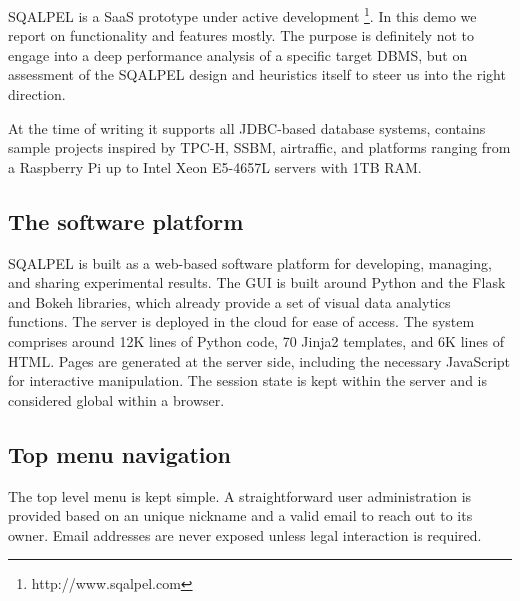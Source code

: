 \documentclass{cidr-2019}
\begin{document}
 
{\sc SQALPEL} is a SaaS prototype under active development \footnote{http://www.sqalpel.com }.
In this
demo we report on functionality and features mostly. The purpose is definitely
not to engage into a deep performance analysis of a specific target
DBMS, but on assessment of the {\sc SQALPEL} design and heuristics itself to
steer us into the right direction. 

At the time of writing it supports all JDBC-based database systems, contains sample projects inspired by TPC-H, SSBM, airtraffic, and platforms ranging from a Raspberry Pi up to Intel Xeon E5-4657L servers with 1TB RAM.


\subsection{The software platform}\label{GUI}
{\sc SQALPEL} is built as a web-based software platform for developing,
managing, and sharing experimental results. The GUI is built around Python and the
Flask and Bokeh libraries, which already provide a set of visual
data analytics functions. The server is deployed in the cloud for ease of access.
The system comprises around 12K lines of Python code, 
70 Jinja2 templates, and 6K lines of HTML.
Pages are generated at the server side, including the necessary JavaScript
for interactive manipulation.
The session state is kept within the server and is considered global within a browser.

\subsection{Top menu navigation}
The top level menu is kept simple. A straightforward user administration
is provided based on an unique nickname and a valid email to reach out to its owner.
Email addresses are never exposed unless legal interaction is required.
\end{document}
